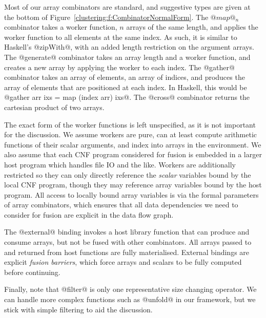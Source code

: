 Most of our array combinators are standard, and suggestive types are given at the bottom of Figure~\ref{clustering:f:CombinatorNormalForm}. The $@map@_n$ combinator takes a worker function, $n$ arrays of the same length, and applies the worker function to all elements at the same index. As such, it is similar to Haskell's @zipWith@, with an added length restriction on the argument arrays. The @generate@ combinator takes an array length and a worker function, and creates a new array by applying the worker to each index. The @gather@ combinator takes an array of elements, an array of indices, and produces the array of elements that are positioned at each index. In Haskell, this would be @gather arr ixs = map (index arr) ixs@. The @cross@ combinator returns the cartesian product of two arrays. 

The exact form of the worker functions is left unspecified, as it is not important for the discussion. We assume workers are pure, can at least compute arithmetic functions of their scalar arguments, and index into arrays in the environment. We also assume that each CNF program considered for fusion is embedded in a larger host program which handles file IO and the like. Workers are additionally restricted so they can only directly reference the \emph{scalar} variables bound by the local CNF program, though they may reference array variables bound by the host program. All access to locally bound array variables is via the formal parameters of array combinators, which ensures that all data dependencies we need to consider for fusion are explicit in the data flow graph.

The @external@ binding invokes a host library function that can produce and consume arrays, but not be fused with other combinators. All arrays passed to and returned from host functions are fully materialised. External bindings are explicit \emph{fusion barriers}, which force arrays and scalars to be fully computed before continuing. 

Finally, note that @filter@ is only one representative size changing operator. We can handle more complex functions such as @unfold@ in our framework, but we stick with simple filtering to aid the discussion.




